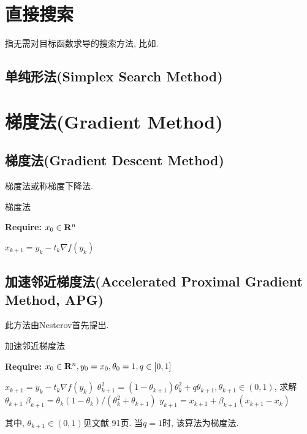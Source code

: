 \documentclass[a4paper,11pt,oneside]{book}
\begin{document}
\section{直接搜索}
指无需对目标函数求导的搜索方法, 比如\cite{schutze2011directed}.

\subsection{单纯形法(Simplex Search Method)}


\section{梯度法(Gradient Method)}

\subsection{梯度法(Gradient Descent Method)}

梯度法或称梯度下降法.

\begin{algorithm}
\caption{梯度法}
\label{alg:APG}
{\bf Require:} $x_0\in {\bf R}^n$
\begin{algorithmic}[1]
	\State $x_{k+1}=y_k-t_k\nabla f(y_k)$
\EndFor
\end{algorithmic}
\end{algorithm}

\subsection{加速邻近梯度法(Accelerated Proximal Gradient Method, APG)}

此方法由Nesterov\cite{nesterov1983method}首先提出.

\begin{algorithm}
\caption{加速邻近梯度法\cite{nesterov1983method,nesterov1998introductory}}
\label{alg:APG}
{\bf Require:} $x_0\in {\bf R}^n, y_0=x_0, \theta_0=1, q\in[0,1]$
\begin{algorithmic}[1]
	\State $x_{k+1}=y_k-t_k\nabla f(y_k)$
	\State $\theta_{k+1}^2=(1-\theta_{k+1})\theta_k^2+q\theta_{k+1}, \theta_{k+1}\in (0,1)$, 求解 $\theta_{k+1}$
	\State $\beta_{k+1}=\theta_k(1-\theta_k)/(\theta_k^2+\theta_{k+1})$
	\State $y_{k+1}=x_{k+1}+\beta_{k+1}(x_{k+1}-x_k)$
\EndFor
\end{algorithmic}
\end{algorithm}
其中, $\theta_{k+1}\in (0,1)$见文献\cite{nesterov1998introductory} 91页. 当$q=1$时, 该算法为梯度法.
\end{document}
